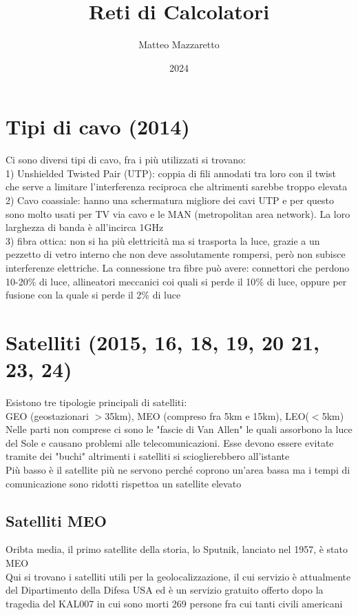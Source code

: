 \documentclass[12pt,oneside,a4paper]{article}
\title{Reti di Calcolatori}
\author{Matteo Mazzaretto}
\date{2024}
\begin{document}
\maketitle
\begin{center}
\renewcommand{\contentsname}{Indice}
\tableofcontents
\end{center}
\setcounter{page}{1}
\newpage
\section{Tipi di cavo (2014)}
Ci sono diversi tipi di cavo, fra i più utilizzati si trovano:\\
1) Unshielded Twisted Pair (UTP): coppia di fili annodati tra loro con il twist che serve a limitare l'interferenza reciproca che altrimenti sarebbe troppo elevata
2) Cavo coassiale: hanno una schermatura migliore dei cavi UTP e per questo sono molto usati per TV via cavo e le MAN (metropolitan area network). La loro larghezza di banda è all'incirca 1GHz\\
3) fibra ottica: non si ha più elettricità ma si trasporta la luce, grazie a un pezzetto di vetro interno che non deve assolutamente rompersi, però non subisce interferenze elettriche. La connessione tra fibre può avere: connettori che perdono 10-20$\%$ di luce, allineatori meccanici coi quali si perde il 10$\%$ di luce, oppure per fusione con la quale si perde il 2$\%$ di luce
\section{Satelliti (2015, 16, 18, 19, 20 21, 23, 24)}
Esistono tre tipologie principali di satelliti: \\
GEO (geostazionari $>$35km), MEO (compreso fra 5km e 15km), LEO($<$5km)\\
Nelle parti non comprese ci sono le "fascie di Van Allen" le quali assorbono la luce del Sole e causano problemi alle telecomunicazioni. Esse devono essere evitate tramite dei "buchi" altrimenti i satelliti si scioglierebbero all'istante\\
Più basso è il satellite più ne servono perché coprono un'area bassa ma i tempi di comunicazione sono ridotti rispettoa  un satellite elevato
\subsection{Satelliti MEO}
Oribta media, il primo satellite della storia, lo Sputnik, lanciato nel 1957, è stato MEO\\
Qui si trovano i satelliti utili per la geolocalizzazione, il cui servizio è attualmente del Dipartimento della Difesa USA ed è un servizio gratuito offerto dopo la tragedia del KAL007 in cui sono morti 269 persone fra cui tanti civili americani
\end{document}
